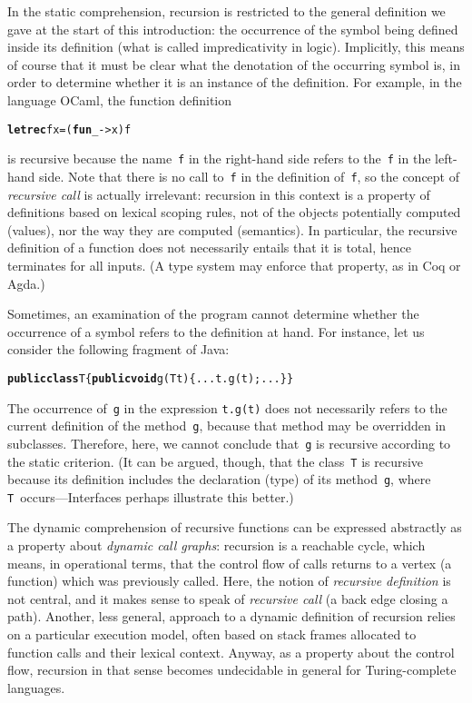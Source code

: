 \documentclass[11pt,a4paper]{article}
\newcommand\plang[1]{\textsf{#1}\xspace}
\newcommand\exc[1]{\texttt{\small #1}}
\begin{document}
In the static comprehension, recursion is restricted to the general
definition we gave at the start of this introduction: the occurrence
of the symbol being defined inside its definition (what is called
impredicativity in logic). Implicitly, this means of course that it
must be clear what the denotation of the occurring symbol is, in order
to determine whether it is an instance of the definition. For example,
in the language \plang{OCaml}, the function definition
{\small
\begin{alltt}
\textbf{let rec} f x = (\textbf{fun} _ -> x) f
\end{alltt}
}
\noindent is recursive because the name~\exc{f} in the right\hyp{}hand
side refers to the~\exc{f} in the left\hyp{}hand side. Note that there
is no call to~\exc{f} in the definition of~\exc{f}, so the concept of
\emph{recursive call} is actually irrelevant: recursion in this
context is a property of definitions based on lexical scoping rules,
not of the objects potentially computed (values), nor the way they are
computed (semantics). In particular, the recursive definition of a
function does not necessarily entails that it is total, hence
terminates for all inputs. (A type system may enforce that property,
as in \plang{Coq} or \plang{Agda}.)

Sometimes, an examination of the program cannot determine
whether the occurrence of a symbol refers to the definition at
hand. For instance, let us consider the following fragment of
\plang{Java}:
{\small
\begin{alltt}
\textbf{public class} T \{ \textbf{public void} g(T t) \{ ... t.g(t); ... \} \}
\end{alltt}}
\noindent The occurrence of~\exc{g} in the expression \exc{t.g(t)}
does not necessarily refers to the current definition of the
method~\exc{g}, because that method may be overridden in
subclasses. Therefore, here, we cannot conclude that~\exc{g} is
recursive according to the static criterion. (It can be argued,
though, that the class~\exc{T} is recursive because its definition
includes the declaration (type) of its method~\exc{g}, where
\exc{T}~occurs---Interfaces perhaps illustrate this better.)

The dynamic comprehension of recursive functions can be expressed
abstractly as a property about \emph{dynamic call graphs}: recursion
is a reachable cycle, which means, in operational terms, that the
control flow of calls returns to a vertex (a function) which was
previously called. Here, the notion of \emph{recursive definition} is
not central, and it makes sense to speak of \emph{recursive call} (a
back edge closing a path). Another, less general, approach to a
dynamic definition of recursion relies on a particular execution
model, often based on stack frames allocated to function calls and
their lexical context. Anyway, as a property about the control flow,
recursion in that sense becomes undecidable in general for
Turing\hyp{}complete languages.
\end{document}
